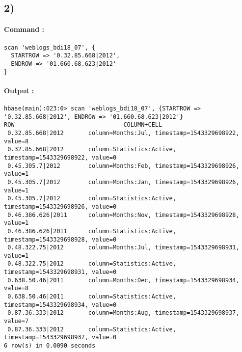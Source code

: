 \documentclass[a4paper,11pt]{report}
\begin{document}
\begin{landscape}

\subsection*{2)}

\paragraph{Command : }

\begin{verbatim}
scan 'weblogs_bdi18_07', {
  STARTROW => '0.32.85.668|2012',
  ENDROW => '01.660.68.623|2012'
}
\end{verbatim}

\paragraph{Output : }

\begin{verbatim}
hbase(main):023:0> scan 'weblogs_bdi18_07', {STARTROW => '0.32.85.668|2012', ENDROW => '01.660.68.623|2012'}
ROW                               COLUMN+CELL                                                                                    
 0.32.85.668|2012       column=Months:Jul, timestamp=1543329698922, value=8                                            
 0.32.85.668|2012       column=Statistics:Active, timestamp=1543329698922, value=0                                     
 0.45.305.7|2012        column=Months:Feb, timestamp=1543329698926, value=1                                            
 0.45.305.7|2012        column=Months:Jan, timestamp=1543329698926, value=1                                            
 0.45.305.7|2012        column=Statistics:Active, timestamp=1543329698926, value=0                                     
 0.46.386.626|2011      column=Months:Nov, timestamp=1543329698928, value=1                                            
 0.46.386.626|2011      column=Statistics:Active, timestamp=1543329698928, value=0                                     
 0.48.322.75|2012       column=Months:Jul, timestamp=1543329698931, value=1                                            
 0.48.322.75|2012       column=Statistics:Active, timestamp=1543329698931, value=0                                     
 0.638.50.46|2011       column=Months:Dec, timestamp=1543329698934, value=8                                            
 0.638.50.46|2011       column=Statistics:Active, timestamp=1543329698934, value=0                                     
 0.87.36.333|2012       column=Months:Aug, timestamp=1543329698937, value=7                                            
 0.87.36.333|2012       column=Statistics:Active, timestamp=1543329698937, value=0                                     
6 row(s) in 0.0090 seconds
\end{verbatim}
\end{landscape}
\end{document}
